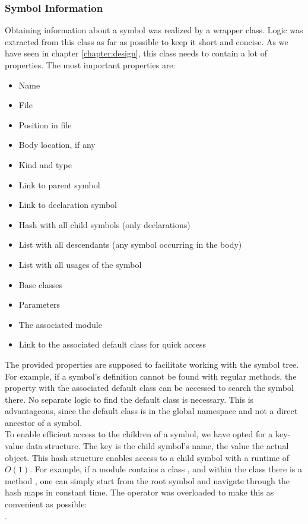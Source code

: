 \subsubsection{Symbol Information}
Obtaining information about a symbol was realized by a wrapper class.
Logic was extracted from this class as far as possible to keep it short and concise.
As we have seen in chapter \ref{chapter:design}, this class needs to contain a lot of properties.
The most important properties are:
\begin{itemize}
    \item Name
    \item File
    \item Position in file
    \item Body location, if any
    \item Kind and type
    \item Link to parent symbol
    \item Link to declaration symbol
    \item Hash with all child symbols (only declarations)
    \item List with all descendants (any symbol occurring in the body)
    \item List with all usages of the symbol
    \item Base classes
    \item Parameters
    \item The associated module
    \item Link to the associated default class for quick access
\end{itemize}

The provided properties are supposed to facilitate working with the symbol tree.
For example, if a symbol's definition cannot be found with regular methods,
the property with the associated default class can be accessed to search the symbol there.
No separate logic to find the default class is necessary.
This is advantageous, since the default class is in the global namespace and not a direct ancestor of a symbol.\\

To enable efficient access to the children of a symbol, we have opted for a key-value data structure.
The key is the child symbol's name, the value the actual  object.
This hash structure enables access to a child symbol with a runtime of $O(1)$.
For example, if a module  contains a class , and within the class there is a method ,
one can simply start from the root symbol and navigate through the hash maps in constant time.
The \code{[]} operator was overloaded to make this as convenient as possible:\\
.\\

